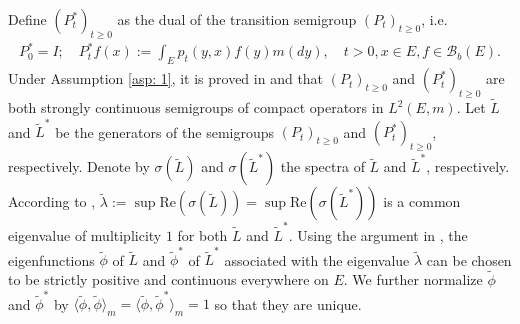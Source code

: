 \documentclass[12pt,a4paper]{amsart}
\theoremstyle{definition}
\numberwithin{equation}{section}
\begin{document}
Define $(P_t^*)_{t\geq 0}$ as the dual of the transition semigroup $(P_t)_{t\geq 0}$, i.e.
\begin{align}
  P_0^* = I; 
  \quad P_t^* f(x) := \int_E p_t(y,x) f(y) m(dy), 
  \quad t > 0, x\in E, f\in \mathscr B_b(E).
\end{align}
Under Assumption \ref{asp: 1}, it is proved in \cite{RenSongZhang2015Limit} and \cite{RenSongZhang2017Central} that $(P_t)_{t \geq 0}$ and $(P^*_t)_{t \geq 0}$ are both strongly continuous semigroups of compact operators in $L^2(E,m)$.
Let $\widetilde L$ and $\widetilde L^*$ be the generators of the semigroups $(P_t)_{t \geq 0}$ and $(P^*_t)_{t \geq 0}$, respectively.
Denote by $\sigma(\widetilde L)$ and $\sigma(\widetilde L^*)$ the spectra of $\widetilde L$ and $\widetilde L^*$, respectively.
According to \cite[Theorem V.6.6]{Schaefer1974Banach},
$\widetilde \lambda := \sup \text{Re}(\sigma(\widetilde L)) = \sup \text{Re}(\sigma(\widetilde L^*))$ is a common eigenvalue of multiplicity $1$ for both $\widetilde L$ and $\widetilde L^*$.
Using the argument in \cite{RenSongZhang2015Limit}, the eigenfunctions $\widetilde \phi$ of $\widetilde L$ and $\widetilde \phi^*$ of $\widetilde L^*$ associated with the eigenvalue $\widetilde \lambda$ can be chosen to be strictly positive and continuous everywhere on $E$.
We further normalize $\widetilde \phi$ and $\widetilde \phi^*$ by $\big\langle \widetilde \phi, \widetilde \phi \big\rangle_m = \big\langle \widetilde \phi, \widetilde \phi^*\big\rangle_m = 1$ so that they are unique.
\end{document}
